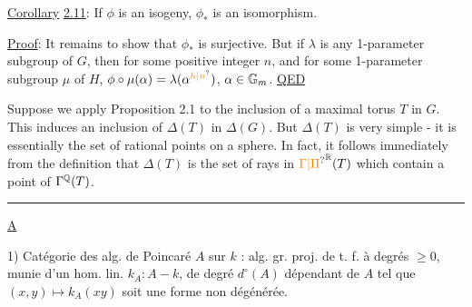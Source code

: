 \uline{Corollary} \uline{2.11}: If $\phi$ is an isogeny, $\phi_*$ is an isomorphism.

\uline{Proof}: It remains to show that $\phi_*$ is surjective. But if $\lambda$ is any 1-parameter subgroup of $G$, then for some positive integer $n$, and for some 1-parameter subgroup $\mu$ of $H$, $\phi\circ\mu(\alpha)=\lambda(\alpha^{\handwritten{\unsure{h|n}}})$, $\alpha\in\mathbb{G}_m$. \uline{QED}

Suppose we apply Proposition 2.1 to the inclusion of a maximal torus $T$ in $G$. This induces an inclusion of $\Delta(T)$ in $\Delta(G)$. But $\Delta(T)$ is very simple - it is essentially the set of rational points on a sphere. In fact, it follows immediately from the definition that $\Delta(T)$ is the set of rays in $\unsure{\Gamma|\Pi}^{\handwritten{\mathbb{R}}}(T)$ which contain a point of $\Gamma^{\mathbb{Q}}(T)$.

\noindent\rule{.91\linewidth}{.4pt}

\uline{A}

1) Catégorie  des alg. de Poincaré $A$ sur $k$ : alg. gr.  proj. de t. f. à degrés $\geq0$, munie d'un hom. lin. $k_A\colon A\mathbin{-}k$, de degré $d^\circ(A)$ dépendant de $A$ tel que $(x,y)\longmapsto k_A(xy)$ soit une forme  non dégénérée. 

